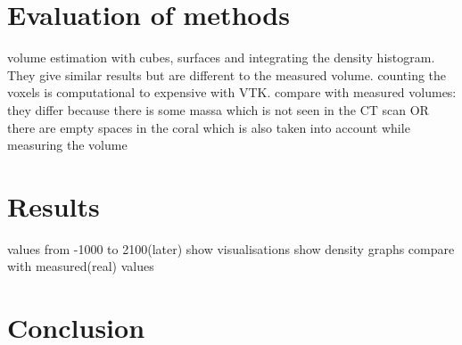 \documentclass[12pt]{article}
\begin{document}
\section{Evaluation of methods}
volume estimation with cubes, surfaces and integrating the density histogram. They give similar results but are different to the measured volume. counting the voxels is computational to expensive with VTK.
compare with measured volumes:
they differ because there is some massa which is not seen in the CT scan OR there are empty spaces in the coral which is also taken into account while measuring the volume

\section{Results}
values from -1000 to 2100(later)
show visualisations
show density graphs
compare with measured(real) values
\section{Conclusion}
\end{document}
